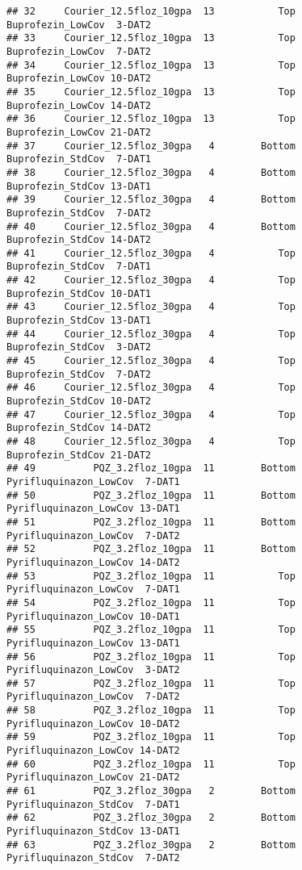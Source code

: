 \documentclass[
]{article}
\begin{document}
\begin{verbatim}
## 32     Courier_12.5floz_10gpa  13           Top      Buprofezin_LowCov  3-DAT2
## 33     Courier_12.5floz_10gpa  13           Top      Buprofezin_LowCov  7-DAT2
## 34     Courier_12.5floz_10gpa  13           Top      Buprofezin_LowCov 10-DAT2
## 35     Courier_12.5floz_10gpa  13           Top      Buprofezin_LowCov 14-DAT2
## 36     Courier_12.5floz_10gpa  13           Top      Buprofezin_LowCov 21-DAT2
## 37     Courier_12.5floz_30gpa   4        Bottom      Buprofezin_StdCov  7-DAT1
## 38     Courier_12.5floz_30gpa   4        Bottom      Buprofezin_StdCov 13-DAT1
## 39     Courier_12.5floz_30gpa   4        Bottom      Buprofezin_StdCov  7-DAT2
## 40     Courier_12.5floz_30gpa   4        Bottom      Buprofezin_StdCov 14-DAT2
## 41     Courier_12.5floz_30gpa   4           Top      Buprofezin_StdCov  7-DAT1
## 42     Courier_12.5floz_30gpa   4           Top      Buprofezin_StdCov 10-DAT1
## 43     Courier_12.5floz_30gpa   4           Top      Buprofezin_StdCov 13-DAT1
## 44     Courier_12.5floz_30gpa   4           Top      Buprofezin_StdCov  3-DAT2
## 45     Courier_12.5floz_30gpa   4           Top      Buprofezin_StdCov  7-DAT2
## 46     Courier_12.5floz_30gpa   4           Top      Buprofezin_StdCov 10-DAT2
## 47     Courier_12.5floz_30gpa   4           Top      Buprofezin_StdCov 14-DAT2
## 48     Courier_12.5floz_30gpa   4           Top      Buprofezin_StdCov 21-DAT2
## 49          PQZ_3.2floz_10gpa  11        Bottom Pyrifluquinazon_LowCov  7-DAT1
## 50          PQZ_3.2floz_10gpa  11        Bottom Pyrifluquinazon_LowCov 13-DAT1
## 51          PQZ_3.2floz_10gpa  11        Bottom Pyrifluquinazon_LowCov  7-DAT2
## 52          PQZ_3.2floz_10gpa  11        Bottom Pyrifluquinazon_LowCov 14-DAT2
## 53          PQZ_3.2floz_10gpa  11           Top Pyrifluquinazon_LowCov  7-DAT1
## 54          PQZ_3.2floz_10gpa  11           Top Pyrifluquinazon_LowCov 10-DAT1
## 55          PQZ_3.2floz_10gpa  11           Top Pyrifluquinazon_LowCov 13-DAT1
## 56          PQZ_3.2floz_10gpa  11           Top Pyrifluquinazon_LowCov  3-DAT2
## 57          PQZ_3.2floz_10gpa  11           Top Pyrifluquinazon_LowCov  7-DAT2
## 58          PQZ_3.2floz_10gpa  11           Top Pyrifluquinazon_LowCov 10-DAT2
## 59          PQZ_3.2floz_10gpa  11           Top Pyrifluquinazon_LowCov 14-DAT2
## 60          PQZ_3.2floz_10gpa  11           Top Pyrifluquinazon_LowCov 21-DAT2
## 61          PQZ_3.2floz_30gpa   2        Bottom Pyrifluquinazon_StdCov  7-DAT1
## 62          PQZ_3.2floz_30gpa   2        Bottom Pyrifluquinazon_StdCov 13-DAT1
## 63          PQZ_3.2floz_30gpa   2        Bottom Pyrifluquinazon_StdCov  7-DAT2

\end{verbatim}
\end{document}
